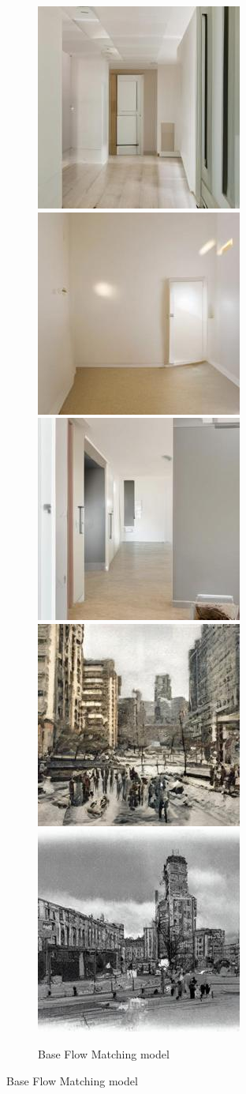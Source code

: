 \begin{figure}[h!]
    \centering
    \begin{subfigure}[t]{0.32\linewidth}
    \centering
    \caption*{Base Flow Matching model}
	\includegraphics[width=0.320\linewidth]{figs/samples_appendix_3/base_cfg_2_ode_prompt_6_image_1.jpg}\;%
	\includegraphics[width=0.320\linewidth]{figs/samples_appendix_3/base_cfg_2_ode_prompt_6_image_2.jpg}\;%
	\includegraphics[width=0.320\linewidth]{figs/samples_appendix_3/base_cfg_2_ode_prompt_6_image_3.jpg}\\ 
	\includegraphics[width=0.320\linewidth]{figs/samples_appendix_3/base_cfg_2_ode_prompt_14_image_1.jpg}\;%
	\includegraphics[width=0.320\linewidth]{figs/samples_appendix_3/base_cfg_2_ode_prompt_14_image_2.jpg}\;%

\end{subfigure}
\end{figure}
